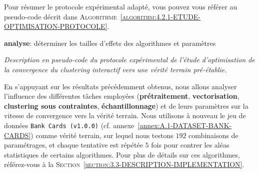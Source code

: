 			Pour résumer le protocole expérimental adapté, vous pouvez vous référer au pseudo-code décrit dans \textsc{Algorithme~\ref{algorithm:4.2.1-ETUDE-OPTIMISATION-PROTOCOLE}}.
			
			\begin{algorithm}
				\textbf{analyse}: déterminer les tailles d'effets des algorithmes et paramètres \;
				\caption{\textit{
					Description en pseudo-code du protocole expérimental de l'étude d'optimisation de la convergence du \textit{clustering} interactif vers une vérité terrain pré-établie.
				}}
				\label{algorithm:4.2.1-ETUDE-OPTIMISATION-PROTOCOLE}
			\end{algorithm}
			
			En s'appuyant sur les résultats précédemment obtenus,
			nous allons analyser l'influence des différentes tâches employées (\textbf{prétraitement}, \textbf{vectorisation}, \textbf{clustering sous contraintes}, \textbf{échantillonnage}) et de leurs paramètres sur la vitesse de convergence vers la vérité terrain.
			Nous utilisons à nouveau le jeu de données \texttt{Bank Cards (v1.0.0)} (cf. annexe~\ref{annex:A.1-DATASET-BANK-CARDS}) comme vérité terrain, sur lequel nous testons $192$ combinaisons de paramétrages, et chaque tentative est répétée $5$ fois pour contrer les aléas statistiques de certains algorithmes.
			Pour plus de détails sur ces algorithmes, référez-vous à la \textsc{Section~\ref{section:3.3-DESCRIPTION-IMPLEMENTATION}}.
			
